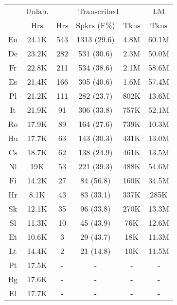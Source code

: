 
\begin{table}[t]
    \centering
    \small
    \begin{tabular}{c|c|ccc|c}
    \toprule
    & Unlab. & \multicolumn{3}{c|}{Transcribed} & LM \\
    & Hrs & Hrs & Spkrs (F\%) & Tkns & Tkns \\
    \midrule
    En & 24.1K & 543 & 1313 (29.6) & 4.8M & 60.1M \\
    De & 23.2K & 282 & 531 (30.6) & 2.3M & 50.0M \\
    Fr & 22.8K & 211 & 534 (38.6) & 2.1M & 58.6M \\
    Es & 21.4K & 166 & 305 (40.6) & 1.6M & 57.4M \\
    Pl & 21.2K & 111 & 282 (23.7) & 802K & 13.6M \\
    It & 21.9K & 91 & 306 (33.8) & 757K & 52.1M \\
    Ro & 17.9K & 89 & 164 (27.6) & 739K & 10.3M \\
    Hu & 17.7K & 63 & 143 (30.3) & 431K & 13.0M \\
    Cs & 18.7K & 62 & 138 (24.9) & 461K & 13.5M \\
    Nl & 19K & 53 & 221 (39.3) & 488K & 54.6M \\
    Fi & 14.2K & 27 & 84 (56.8) & 160K & 34.5M \\
    Hr & 8.1K & 43 & 83 (33.1) & 337K & 285K \\
    Sk & 12.1K & 35 & 96 (33.8) & 270K & 13.3M \\
    Sl & 11.3K & 10 & 45 (43.9) & 76K & 12.6M \\
    Et & 10.6K & 3 & 29 (43.7) & 18K & 11.3M \\
    Lt & 14.4K & 2 & 21 (14.8) & 10K & 11.5M \\
    Pt & 17.5K & - & - & - & - \\
    Bg & 17.6K & - & - & - & - \\
    El & 17.7K & - & - & - & - \\

\end{tabular}
\end{table}
